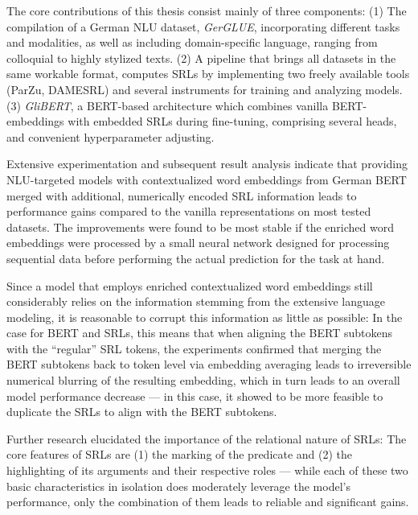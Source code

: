 \label{chap:6_conclusion}



The core contributions of this thesis consist mainly of three components: (1)
The compilation of a German NLU dataset, \emph{GerGLUE}, incorporating different
tasks and modalities, as well as including domain-specific language, ranging from
colloquial to highly stylized texts. (2) A pipeline that brings all datasets in
the same workable format, computes SRLs by implementing two freely available tools
(ParZu, DAMESRL) and several instruments for training and analyzing models. (3)
\emph{GliBERT}, a BERT-based architecture which combines vanilla BERT-embeddings
with embedded SRLs during fine-tuning, comprising several heads, and convenient
hyperparameter adjusting.

Extensive experimentation and subsequent result analysis indicate that providing NLU-targeted
models with contextualized word embeddings from German BERT merged with additional, numerically
encoded SRL information leads to performance gains compared to the vanilla representations on
most tested datasets. The improvements were found to be most stable if the enriched word
embeddings were processed by a small neural network designed for processing sequential data
before performing the actual prediction for the task at hand.

Since a model that employs enriched contextualized word embeddings still considerably relies on
the information stemming from the extensive language modeling, it is reasonable to corrupt this
information as little as possible: In the case for BERT and SRLs, this means that when aligning the
BERT subtokens with the ``regular'' SRL tokens, the experiments confirmed that merging the BERT
subtokens back to token level via embedding averaging leads to irreversible numerical blurring of
the resulting embedding, which in turn leads to an overall model performance decrease --- in this
case, it showed to be more feasible to duplicate the SRLs to align with the BERT subtokens.

Further research elucidated the importance of the relational nature of SRLs: The core
features of SRLs are (1) the marking of the predicate and (2) the highlighting of its
arguments and their respective roles --- while each of these two basic characteristics
in isolation does moderately leverage the model's performance, only the combination of
them leads to reliable and significant gains.

